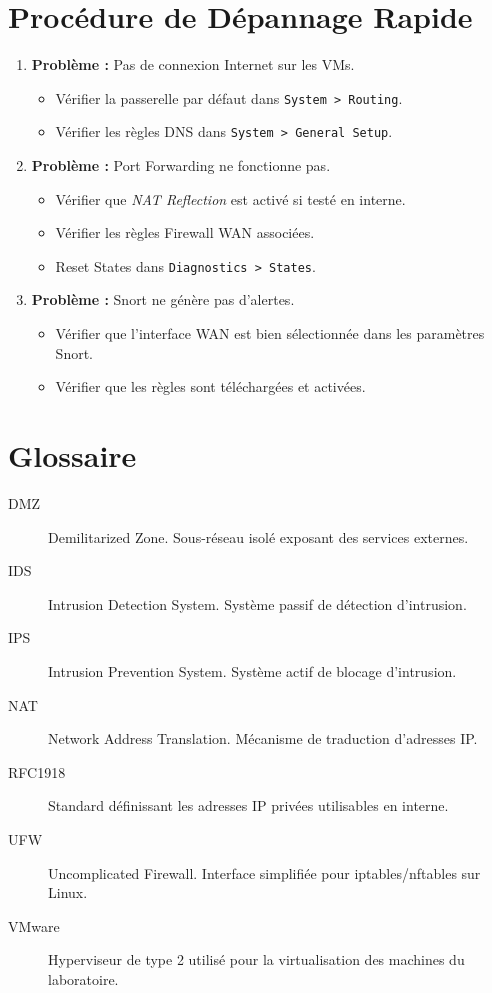 \documentclass[12pt,a4paper,openany]{report}
\begin{document}
	\section{Procédure de Dépannage Rapide}
	\begin{enumerate}
		\item \textbf{Problème :} Pas de connexion Internet sur les VMs.
		\begin{itemize}
			\item Vérifier la passerelle par défaut dans \texttt{System > Routing}.
			\item Vérifier les règles DNS dans \texttt{System > General Setup}.
		\end{itemize}
		\item \textbf{Problème :} Port Forwarding ne fonctionne pas.
		\begin{itemize}
			\item Vérifier que \textit{NAT Reflection} est activé si testé en interne.
			\item Vérifier les règles Firewall WAN associées.
			\item Reset States dans \texttt{Diagnostics > States}.
		\end{itemize}
		\item \textbf{Problème :} Snort ne génère pas d'alertes.
		\begin{itemize}
			\item Vérifier que l'interface WAN est bien sélectionnée dans les paramètres Snort.
			\item Vérifier que les règles sont téléchargées et activées.
		\end{itemize}
	\end{enumerate}
	
	\section{Glossaire}
	\begin{description}
		\item[DMZ]     Demilitarized Zone. Sous-réseau isolé exposant des services externes.
		\item[IDS]     Intrusion Detection System. Système passif de détection d'intrusion.
		\item[IPS]     Intrusion Prevention System. Système actif de blocage d'intrusion.
		\item[NAT]     Network Address Translation. Mécanisme de traduction d'adresses IP.
		\item[RFC1918] Standard définissant les adresses IP privées utilisables en interne.
		\item[UFW]     Uncomplicated Firewall. Interface simplifiée pour iptables/nftables sur Linux.
		\item[VMware]  Hyperviseur de type 2 utilisé pour la virtualisation des machines du laboratoire.
	\end{description}
	
\end{document}
